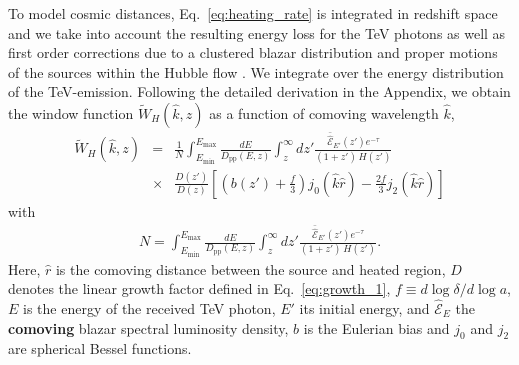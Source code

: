 \documentclass[numberedappendix]{emulateapj}
\newcommand\Ec[1]{{\color{magenta} \bf #1}} %
\begin{document}
To model cosmic distances, Eq.~\eqref{eq:heating_rate} is integrated in redshift space and we take into account the resulting energy loss for the TeV photons as well as first order corrections due to a clustered blazar distribution and proper motions of the sources within the Hubble flow \citep{1987MNRAS.227....1K}. We integrate over the energy distribution of the TeV-emission. Following the detailed derivation in the Appendix, we obtain the window function $\tilde{W}_H(\hat{k},z)$ as a function of comoving wavelength $\hat{k}$,
\begin{eqnarray}
\label{eq:window}
\tilde{W}_H(\hat{k},z)&=&\frac{1}{N}\int_{E_{\mathrm{min}}}^{E_{\mathrm{max}}}\frac{dE}{D_{\mathrm{pp}}(E,z)}
\int_z^{\infty}dz' \frac{\mathcal{\bar{\hat E}}_{E'}(z')e^{-\tau}}{(1+z')\,H(z')} \nonumber\\
&\times& \frac{D(z')}{D(z)}\left[\left(b(z')+\frac{f}{3}\right)j_0(\hat k \hat r)-\frac{2f}{3}j_2(\hat k \hat r)\right]
\end{eqnarray}
with
\begin{eqnarray}
\label{eq:define_N}
N=\int_{E_{\mathrm{min}}}^{E_{\mathrm{max}}} \frac{dE}{{D_{\mathrm{pp}}}(E,z)}
\int_z^{\infty} dz'   \frac{\mathcal{\bar{\hat E}}_{E'}(z') e^{-\tau}}{(1+z')\,H(z')}.
\end{eqnarray}
Here, $\hat{r}$ is the comoving distance between the source and heated
region, $D$ denotes the linear growth factor defined in
Eq.~\eqref{eq:growth_1}, $f\equiv d\log \delta/d \log a$, $E$ is the
energy of the received TeV photon, $E'$ its initial energy, and
$\hat{\mathcal{E}}_E$ the \Ec{comoving} blazar spectral luminosity density, $b$
is the Eulerian bias and $j_0$ and $j_2$ are spherical Bessel
functions.
\end{document}
